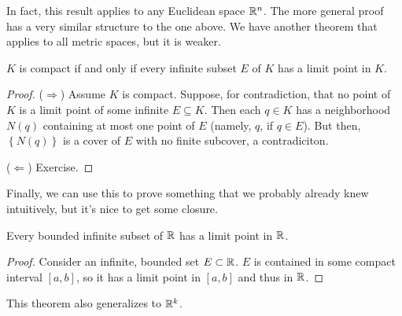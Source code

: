 \documentclass[../m131main.tex]{subfiles}
\begin{document}
In fact, this result applies to any Euclidean space $\mathbb{R}^n$.
The more general proof has a very similar structure to the one above.
We have another theorem that applies to all metric spaces, but it is weaker.

\begin{theorem}[]
    $K$ is compact if and only if every infinite subset $E$ of $K$ has a limit point in $K$.
\end{theorem}

\begin{proof}
    ($\Rightarrow$)
    Assume $K$ is compact.
    Suppose, for contradiction, that no point of $K$ is a limit point of some infinite $E \subseteq K$.
    Then each $q \in K$ has a neighborhood $N(q)$ containing at most one point of $E$ (namely, $q$, if $q \in E$).
    But then, $\left\{ N(q) \right\}$ is a cover of $E$ with no finite subcover, a contradiciton.

    ($\Leftarrow$) Exercise.
\end{proof}

Finally, we can use this to prove something that we probably already knew intuitively, but it's nice to get some closure.

\begin{corollary}
    Every bounded infinite subset of $\mathbb{R}$ has a limit point in $\mathbb{R}$.
\end{corollary}

\begin{proof}
    Consider an infinite, bounded set $E \subset \mathbb{R}$.
    $E$ is contained in some compact interval $[a,b]$, so it has a limit point in $[a,b]$ and thus in $\mathbb{R}$.
\end{proof}

This theorem also generalizes to $\mathbb{R}^k$.

\end{document}
